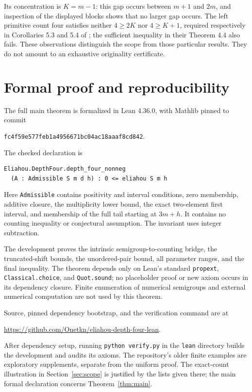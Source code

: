 \documentclass[11pt]{article}
\begin{document}
Its concentration is $K=m-1$: this gap occurs between $m+1$ and $2m$,
and inspection of the displayed blocks shows that no larger gap occurs.
The left primitive count four satisfies neither $4\geq2K$ nor
$4\geq K+1$, required respectively in Corollaries 5.3 and 5.4 of
\cite{concentration}; the sufficient inequality in their Theorem 4.4
also fails. These observations distinguish the scope from those particular
results. They do not amount to an exhaustive originality certificate.

\section{Formal proof and reproducibility}

The full main theorem is formalized in Lean 4.36.0, with Mathlib pinned
to commit
\begin{center}
\texttt{fc4f59e577feb1a4956671bc04ac18aaaf8cd842}.
\end{center}
The checked declaration is
\begin{verbatim}
Eliahou.DepthFour.depth_four_nonneg
  (A : Admissible S m d h) : 0 <= eliahou S m h
\end{verbatim}
Here \texttt{Admissible} contains positivity and interval conditions,
zero membership, additive closure, the multiplicity lower bound,
the exact two-element first interval, and membership of the full tail
starting at $3m+h$. It contains no counting inequality or conjectural
assumption. The invariant uses integer subtraction.

The development proves the intrinsic semigroup-to-counting bridge,
the truncated-shift bounds, the unordered-pair bound, all parameter
ranges, and the final inequality. The theorem depends only on Lean's
standard \texttt{propext}, \texttt{Classical.choice}, and
\texttt{Quot.sound}; no placeholder proof or new axiom occurs in its
dependency closure. Finite enumeration of numerical semigroups and
external numerical computation are not used by this theorem.

Source, pinned dependency bootstrap, and the verification command are at
\begin{center}
\url{https://github.com/Onetkn/eliahou-depth-four-lean}.
\end{center}
After dependency setup, running \texttt{python verify.py} in the
\texttt{lean} directory builds the development and audits its axioms.
The repository's older finite examples are exploratory supplements,
separate from the uniform proof. The exact-count illustration in
Section~\ref{sec:scope} is justified by the lists given there; the main
formal declaration concerns Theorem~\ref{thm:main}.
\end{document}
